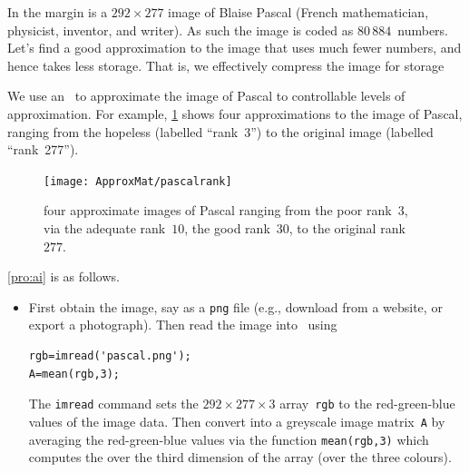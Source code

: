\begin{example} \label{eg:pascal}
In the margin is a \(292\times277\) image of Blaise Pascal (French mathematician, physicist, inventor, and writer).  
As such the image is coded as \(80\,884\)~numbers.
Let's find a good approximation to the image that uses much fewer numbers, and hence takes less storage.
That is, we effectively compress the image for storage 

\begin{solution} 
We use an \svd\ to approximate the image of Pascal to controllable levels of approximation.
For example, \cref{fig:pascalrank} shows four approximations to the image of Pascal, ranging from the hopeless (labelled ``rank~3'')  to the original image (labelled ``rank~277'').
\begin{figure}
\caption{four approximate images of Pascal ranging from the poor rank~\(3\), via the adequate rank~\(10\), the good rank~\(30\), to the original rank~\(277\).}
\label{fig:pascalrank}
\centering
\texttt{[image: ApproxMat/pascalrank]}
\end{figure}

\cref{pro:ai} is as follows.
\begin{itemize}
\item First obtain the image, say as a \verb|png| file (e.g., download from a website, or export a photograph). Then read the image into \script\ using 
\begin{verbatim}
rgb=imread('pascal.png');
A=mean(rgb,3);
\end{verbatim}
The \verb|imread| command sets the \(292\times277\times3\) array~\verb|rgb| to the red-green-blue values of the image data. 
Then convert into a greyscale image matrix~\verb|A| by averaging the 
red-green-blue values via the function \verb|mean(rgb,3)| which computes the  over the third dimension of the array (over the three colours).


\end{itemize}
\end{solution}
\end{example}
